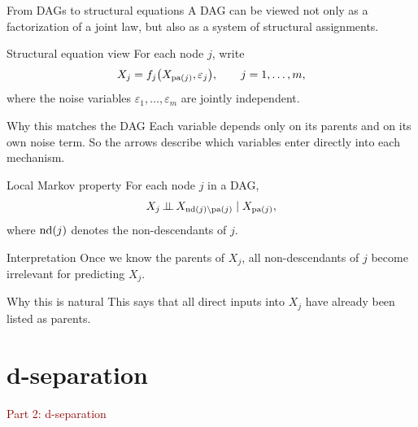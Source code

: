 \documentclass[dvipsnames,aspectratio=169,handout]{beamer}
\begin{document}
\begin{frame}{From DAGs to structural equations}
A DAG can be viewed not only as a factorization of a joint law, but also as a system of structural assignments.

\begin{block}{Structural equation view}
For each node $j$, write
\[
X_j = f_j\bigl(X_{\operatorname{pa}(j)},\varepsilon_j\bigr),
\qquad j=1,\ldots,m,
\]
where the noise variables $\varepsilon_1,\ldots,\varepsilon_m$ are jointly independent.
\end{block}

\begin{alertblock}{Why this matches the DAG}
Each variable depends only on its parents and on its own noise term.
So the arrows describe which variables enter directly into each mechanism.
\end{alertblock}
\end{frame}

\begin{frame}{Local Markov property}
For each node $j$ in a DAG,
\[
X_j \mbox{\,$\perp\!\!\!\perp$\,} X_{\operatorname{nd}(j)\setminus \operatorname{pa}(j)}\mid X_{\operatorname{pa}(j)},
\]
where $\operatorname{nd}(j)$ denotes the non-descendants of $j$.
\medskip

\begin{block}{Interpretation}
Once we know the parents of $X_j$, all non-descendants of $j$ become irrelevant for predicting $X_j$.
\end{block}

\begin{alertblock}{Why this is natural}
This says that all direct inputs into $X_j$ have already been listed as parents.
\end{alertblock}
\end{frame}


\section{d-separation}

\begin{frame}{}
\begin{center}
{\Huge \textcolor{DarkRed}{Part 2: d-separation}}
\end{center}
\end{frame}
\end{document}
